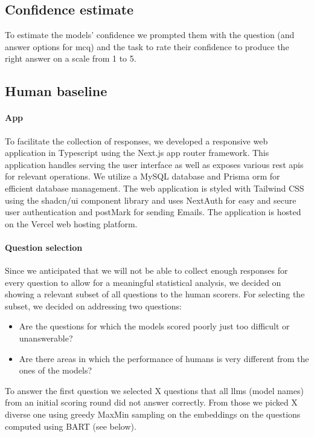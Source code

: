 \documentclass[11pt, oneside]{article}
\begin{document}
\subsection{Confidence estimate}
To estimate the models' confidence we prompted them with the question (and answer options for \gls{mcq}) and the task to rate their confidence to produce the right answer on a scale from 1 to 5. 

\subsection{Human baseline}

\paragraph{App} To facilitate the collection of responses, we developed a responsive web application in Typescript using the Next.js\cite{nextjs} app router framework.
This application handles serving the user interface as well as exposes various \gls{rest} \glspl{api} for relevant operations.
We utilize a MySQL\cite{mysql} database and Prisma \gls{orm}\cite{prisma} for efficient database management.
The web application is styled with Tailwind CSS\cite{tailwindcss} using the shadcn/ui component library and uses NextAuth\cite{nextauth} for easy and secure user authentication and postMark for sending Emails.
The application is hosted on the Vercel web hosting platform.

\paragraph{Question selection} \label{sec:subset-selection}
Since we anticipated that we will not be able to collect enough responses for every question to allow for a meaningful statistical analysis, we decided on showing a relevant subset of all questions to the human scorers.
For selecting the subset, we decided on addressing two questions:
\begin{itemize}
    \item Are the questions for which the models scored poorly just too difficult or unanswerable?
    \item Are there areas in which the performance of humans is very different from the ones of the models?
\end{itemize}
To answer the first question we selected X questions that all \glspl{llm} (model names) from an initial scoring round did not answer correctly.
From those we picked X diverse one using greedy MaxMin sampling on the embeddings on the questions computed using BART (see below).
\end{document}
